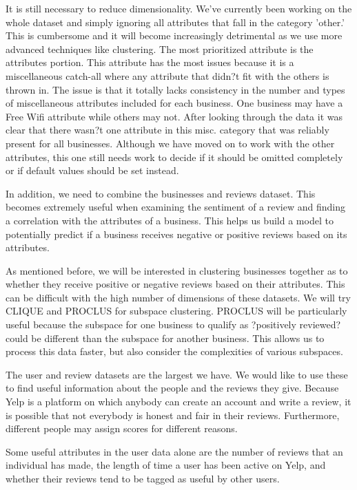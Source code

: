 \quad It is still necessary to reduce dimensionality. We've currently been working on the whole dataset and simply ignoring all attributes that fall in the category 'other.' This is cumbersome and it will become increasingly detrimental as we use more advanced techniques like clustering. The most prioritized attribute is the attributes portion. This attribute has the most issues because it is a miscellaneous catch-all where any attribute that didn?t fit with the others is thrown in. The issue is that it totally lacks consistency in the number and types of miscellaneous attributes included for each business. One business may have a Free Wifi attribute while others may not. After looking through the data it was clear that there wasn?t one attribute in this misc. category that was reliably present for all businesses. Although we have moved on to work with the other attributes, this one still needs work to decide if it should be omitted completely or if default values should be set instead.

\quad In addition, we need to combine the businesses and reviews dataset. This becomes extremely useful when examining the sentiment of a review and finding a correlation with the attributes of a business. This helps us build a model to potentially predict if a business receives negative or positive reviews based on its attributes. 

\quad As mentioned before, we will be interested in clustering businesses together as to whether they receive positive or negative reviews based on their attributes. This can be difficult with the high number of dimensions of these datasets. We will try CLIQUE and PROCLUS for subspace clustering. PROCLUS will be particularly useful because the subspace for one business to qualify as ?positively reviewed? could be different than the subspace for another business. This allows us to process this data faster, but also consider the complexities of various subspaces. 

\quad The user and review datasets are the largest we have. We would like to use these to find useful information about the people and the reviews they give. Because Yelp is a platform on which anybody can create an account and write a review, it is possible that not everybody is honest and fair in their reviews. Furthermore, different people may assign scores for different reasons. 

\quad Some useful attributes in the user data alone are the number of reviews that an individual has made, the length of time a user has been active on Yelp, and whether their reviews tend to be tagged as useful by other users. 

